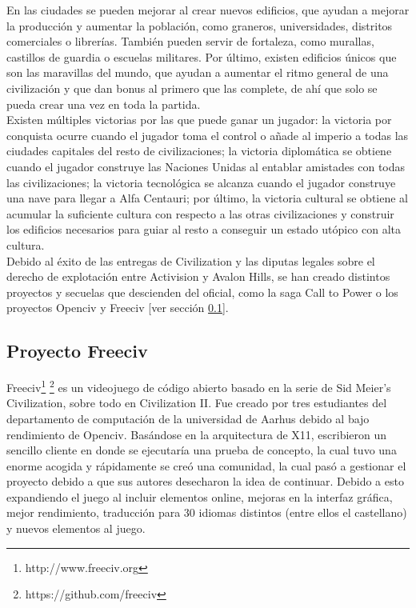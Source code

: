 En las ciudades se pueden mejorar al crear nuevos edificios, que ayudan a mejorar la producción y aumentar la población, como graneros, universidades, distritos comerciales o librerías. También pueden servir de fortaleza, como murallas, castillos de guardia o escuelas militares. Por último, existen edificios únicos que son las maravillas del mundo, que ayudan a aumentar el ritmo general de una civilización y que dan bonus al primero que las complete, de ahí que solo se pueda crear una vez en toda la partida. \\

Existen múltiples victorias por las que puede ganar un jugador: la victoria por conquista ocurre cuando el jugador toma el control o añade al imperio a todas las ciudades capitales del resto de civilizaciones; la victoria diplomática se obtiene cuando el jugador construye las Naciones Unidas al entablar amistades con todas las civilizaciones; la victoria tecnológica se alcanza cuando el jugador construye una nave para llegar a Alfa Centauri; por último, la victoria cultural se obtiene al acumular la suficiente cultura con respecto a las otras civilizaciones y construir los edificios necesarios para guiar al resto a conseguir un estado utópico con alta cultura. \\

Debido al éxito de las entregas de Civilization y las diputas legales sobre el derecho de explotación entre Activision y Avalon Hills, se han creado distintos proyectos y secuelas que descienden del oficial, como la saga Call to Power o los proyectos Openciv y Freeciv [ver sección \ref{subsec:freeciv}].

\subsection{Proyecto Freeciv}\label{subsec:freeciv}

Freeciv\footnote{http://www.freeciv.org} \footnote{https://github.com/freeciv} es un videojuego de código abierto basado en la serie de Sid Meier's Civilization, sobre todo en Civilization II. Fue creado por tres estudiantes del departamento de computación de la universidad de Aarhus debido al bajo rendimiento de Openciv. Basándose en la arquitectura de X11, escribieron un sencillo cliente en donde se ejecutaría una prueba de concepto, la cual tuvo una enorme acogida y rápidamente se creó una comunidad, la cual pasó a gestionar el proyecto debido a que sus autores desecharon la idea de continuar. Debido a esto expandiendo el juego al incluir elementos online, mejoras en la interfaz gráfica, mejor rendimiento, traducción para 30 idiomas distintos (entre ellos el castellano) y nuevos elementos al juego. \\

